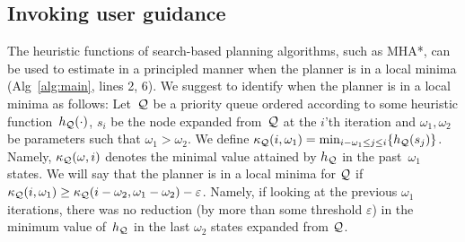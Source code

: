 \documentclass[conference]{IEEEtran}
\begin{document}
\subsection{Invoking user guidance}
\label{sec:q1}
The heuristic functions of search-based planning algorithms, such as MHA*, can be used to estimate in a principled manner when the planner is in a local minima (Alg~\ref{alg:main}, lines 2, 6). 
%
We suggest to identify when the planner is in a local minima as follows:
Let~$\mathcal{Q}$ be a priority queue 
ordered according to some heuristic function~$h_{\mathcal{Q}}(\cdot)$,
$s_i$ be the node expanded from~$\mathcal{Q}$ at the $i$'th iteration and $\omega_1, \omega_2$ be parameters such that $\omega_1 > \omega_2$.
%
We define 
$\kappa_{\mathcal{Q}}(i, \omega_1) = \min_{i-\omega_1 \leq j \leq i} \{ h_{\mathcal{Q}}(s_j)\}$.
Namely, $\kappa_{\mathcal{Q}}(\omega,i)$ denotes the minimal value attained by $h_{\mathcal{Q}}$ in the past~$\omega_1$ states. 
%
We will say that the planner is in a local minima for $\mathcal{Q}$ if 
$\kappa_{\mathcal{Q}}(i, \omega_1) \geq \kappa_{\mathcal{Q}}(i - \omega_2, \omega_1 - \omega_2) - \varepsilon$.
Namely, if looking at the previous $\omega_1$ iterations, 
there was no reduction 
(by more than some threshold $\varepsilon$) 
in the minimum value of~$h_{\mathcal{Q}}$ 
in the last $\omega_2$ states expanded from $\mathcal{Q}$.

%

%
%
%
%
\end{document}
